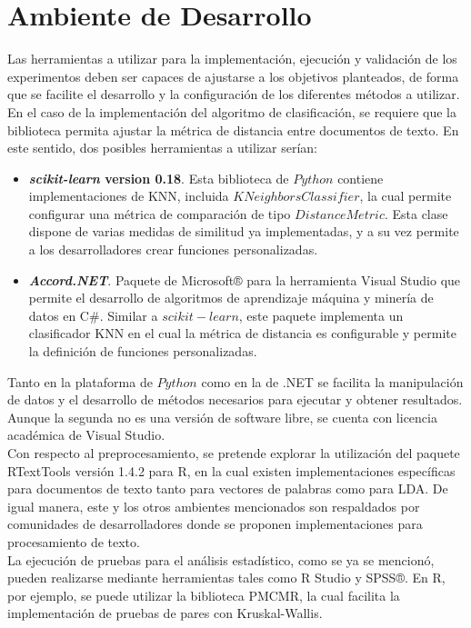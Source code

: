 \section{Ambiente de Desarrollo}
Las herramientas a utilizar para la implementación, ejecución y validación de los experimentos deben ser capaces de ajustarse a los objetivos planteados, de forma que se facilite el desarrollo y la configuración de los diferentes métodos a utilizar.\\
En el caso de la implementación del algoritmo de clasificación, se requiere que la biblioteca permita ajustar la métrica de distancia entre documentos de texto. En este sentido, dos posibles herramientas a utilizar serían:
\begin{itemize}
\item \textbf{\textit{scikit-learn} version 0.18}. Esta biblioteca de $Python$ contiene implementaciones de KNN, incluida $KNeighborsClassifier$, la cual permite configurar una métrica de comparación de tipo $DistanceMetric$. Esta clase dispone de varias medidas de similitud ya implementadas, y a su vez permite a los desarrolladores crear funciones personalizadas.
\item \textbf{\textit{Accord.NET}}. Paquete de Microsoft® para la herramienta Visual Studio que permite el desarrollo de algoritmos de aprendizaje máquina y minería de datos en C\#. Similar a $scikit-learn$, este paquete implementa un clasificador KNN en el cual la métrica de distancia es configurable y permite la definición de funciones personalizadas. 
\end{itemize}
Tanto en la plataforma de $Python$ como en la de .NET se facilita la manipulación de datos y el desarrollo de métodos necesarios para ejecutar y obtener resultados. Aunque la segunda no es una versión de software libre, se cuenta con licencia académica de Visual Studio. \\
Con respecto al preprocesamiento, se pretende explorar la utilización del paquete RTextTools versión 1.4.2 para R, en la cual existen implementaciones específicas para documentos de texto tanto para vectores de palabras como para LDA. De igual manera, este y los otros ambientes mencionados son respaldados por comunidades de desarrolladores donde se proponen implementaciones para procesamiento de texto.\\
La ejecución de pruebas para el análisis estadístico, como se ya se mencionó, pueden realizarse mediante herramientas tales como R Studio y SPSS®. En R, por ejemplo, se puede utilizar la biblioteca PMCMR, la cual facilita la implementación de pruebas de pares con Kruskal-Wallis.
